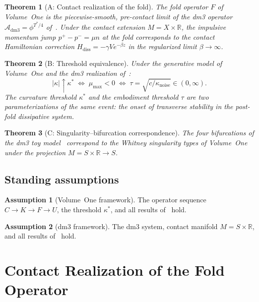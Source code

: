 \documentclass[12pt, oneside]{book}
\theoremstyle{plain}
\newtheorem{theorem}{Theorem}[section]
\theoremstyle{definition}
\newtheorem{assumption}{Assumption}[section]
\theoremstyle{remark}
\newcommand{\R}{\mathbb{R}}
\begin{document}
\begin{theorem}[A: Contact realization of the fold]
\label{thm:A}
The fold operator $F$ of Volume~One is the piecewise-smooth,
pre-contact limit of the dm3 operator
$\mathcal{A}_{\mathrm{dm3}} = \phi^{T^*/4}$ of~\cite{Paper1}.
Under the contact extension $M = X\times\R$, the impulsive
momentum jump $p^+ - p^- = \mu n$ at the fold corresponds to
the contact Hamiltonian correction
$H_{\mathrm{diss}} = -\gamma V e^{-\beta z}$
in the regularized limit $\beta\to\infty$.
\end{theorem}

\begin{theorem}[B: Threshold equivalence]
\label{thm:B}
Under the generative model of Volume~One and the dm3
realization of~\cite{Paper1}:
\[
  |\kappa|\uparrow\kappa^*
  \;\iff\;
  \mu_{\max} < 0
  \;\iff\;
  \tau = \sqrt{c/\kappa_{\mathrm{noise}}} \in (0,\infty).
\]
The curvature threshold $\kappa^*$ and the embodiment threshold
$\tau$ are two parameterizations of the same event: the onset of
transverse stability in the post-fold dissipative system.
\end{theorem}

\begin{theorem}[C: Singularity--bifurcation correspondence]
\label{thm:C}
The four bifurcations of the dm3 toy model~\cite{Paper2}
correspond to the Whitney singularity types of Volume~One
under the projection $M = S\times\R\to S$.
\end{theorem}

\subsection{Standing assumptions}

\begin{assumption}[Volume~One framework]
The operator sequence $C\to K\to F\to U$, the threshold $\kappa^*$,
and all results of~\cite{PO1} hold.
\end{assumption}

\begin{assumption}[dm3 framework]
The dm3 system, contact manifold $M=S\times\R$, and all results
of~\cite{Paper1,Paper2} hold.
\end{assumption}

\section{Contact Realization of the Fold Operator}
\label{sec:contact-fold}
\end{document}
